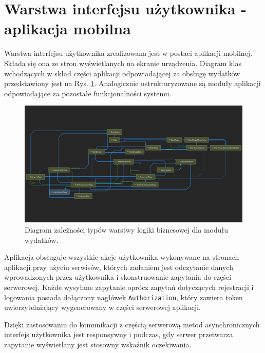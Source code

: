 \section{Warstwa interfejsu użytkownika - aplikacja mobilna}
Warstwa interfejsu użytkownika zrealizowana jest w postaci aplikacji mobilnej. Składa się ona ze stron wyświetlanych na ekranie urządzenia. Diagram klas wchodzących w skład części aplikacji odpowiadającej za obsługę wydatków przedstawiony jest na Rys. \ref{xamarinexpenses}. Analogicznie ustrukturyzowane są moduły aplikacji odpowiadające za pozostałe funkcjonalności systemu.
\begin{figure}[!ht]
	\begin{center}
		\includegraphics[width=6in]{img/diagram/interface_diagram.png}
		\caption{Diagram zależności typów warstwy logiki biznesowej dla modułu wydatków.}
		\label{xamarinexpenses}
	\end{center}
\end{figure}

Aplikacja obsługuje wszystkie akcje użytkownika wykonywane na stronach aplikacji przy użyciu serwisów, których zadaniem jest odczytanie danych wprowadzonych przez użytkownika i skonstruowanie zapytania do części serwerowej. Każde wysyłane zapytanie oprócz zapytań dotyczących rejestracji i logowania posiada dołączony nagłówek \lstinline|Authorization|, który zawiera token uwierzytelniający wygenerowany w części serwerowej aplikacji.

Dzięki zastosowaniu do komunikacji z częścią serwerową metod asynchronicznych interfejs użytkownika jest responsywny i podczas, gdy serwer przetwarza zapytanie wyświetlany jest stosowny wskaźnik oczekiwania.